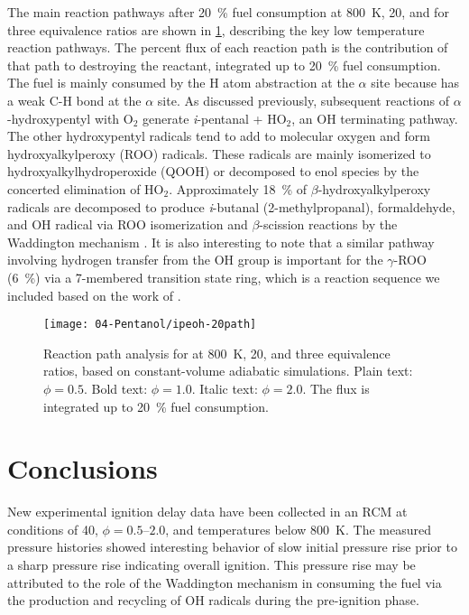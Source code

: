 \documentclass[../main.tex]{subfiles}
\begin{document}
The main \iPeOH{} reaction pathways after \SI{20}{\percent} fuel consumption at
\SI{800}{\kelvin}, \SI{20}{\atmosphere}, and for three equivalence
ratios are shown in \cref{fig:ipeoh-20path}, describing the key low
temperature reaction pathways. The percent flux of each reaction path
is the contribution of that path to destroying the reactant, integrated
up to \SI{20}{\percent} fuel consumption. The fuel is mainly consumed by
the H atom abstraction at the $\alpha$ site because \iPeOH{} has a weak
C-H bond at the $\alpha$ site. As discussed previously, subsequent
reactions of $\alpha$-hydroxypentyl with O$_2$ generate \textit{i}-pentanal
+ HO$_2$, an OH terminating pathway. The other hydroxypentyl radicals tend
to add to molecular oxygen and form hydroxyalkylperoxy (ROO) radicals.
These radicals are mainly isomerized to hydroxyalkylhydroperoxide (QOOH)
or decomposed to enol species by the concerted elimination of HO$_2$. Approximately
\SI{18}{\percent} of $\beta$-hydroxyalkylperoxy radicals are decomposed to produce
\textit{i}-butanal (2-methylpropanal), formaldehyde, and OH radical via ROO
isomerization and $\beta$-scission reactions by the Waddington mechanism
\cite{Ray1973, Sway1983}. It is also interesting to note that a similar
pathway involving hydrogen transfer from the OH group is
important for the $\gamma$-ROO (\SI{6}{\percent}) via a 7-membered transition state
ring, which is a reaction sequence we included based on the work
of \textcite{Welz2012}.

\begin{figure}
    \texttt{[image: 04-Pentanol/ipeoh-20path]}
    \caption{Reaction path analysis for \iPeOH{} at \SI{800}{\kelvin},
    \SI{20}{\atmosphere}, and three equivalence ratios, based on
    constant-volume adiabatic simulations. Plain text: $\phi=0.5$.
    Bold text: $\phi=1.0$. Italic text: $\phi=2.0$. The flux is
    integrated up to \SI{20}{\percent} fuel consumption.}
    \label{fig:ipeoh-20path}
\end{figure}

\section{Conclusions}
\label{sec:ipeoh-conclusions}

New experimental ignition delay data have been collected in an RCM at
conditions of \SI{40}{\atmosphere}, $\phi=\numrange{0.5}{2.0}$, and
temperatures below \SI{800}{\kelvin}. The measured pressure histories
showed interesting behavior of slow initial pressure rise prior to a
sharp pressure rise indicating overall ignition. This pressure rise
may be attributed to the role of the Waddington mechanism in consuming
the fuel via the production and recycling of OH radicals during the
pre-ignition phase.
\end{document}
